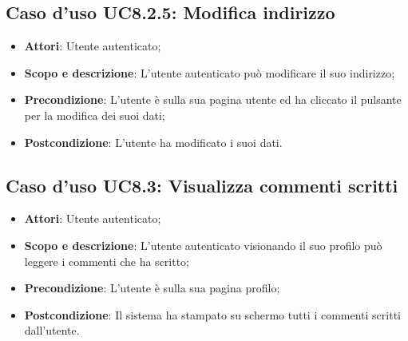 \documentclass[12pt,a4paper,titlepage]{article}
\begin{document}
	\subsection{Caso d'uso UC8.2.5: Modifica indirizzo}
	\label{UC8.2.5}
	\begin{itemize}
		\item \textbf{Attori}: Utente autenticato;
		\item \textbf{Scopo e descrizione}: L'utente autenticato può modificare il suo indirizzo;
		\item \textbf{Precondizione}: L'utente è sulla sua pagina utente ed ha cliccato il pulsante per la modifica dei suoi dati;
		\item \textbf{Postcondizione}: L'utente ha modificato i suoi dati.
	\end{itemize}

	\subsection{Caso d'uso UC8.3: Visualizza commenti scritti}
	\label{UC8.3}
	\begin{itemize}
		\item \textbf{Attori}: Utente autenticato;
		\item \textbf{Scopo e descrizione}: L'utente autenticato visionando il suo profilo può leggere i commenti che ha scritto;
		\item \textbf{Precondizione}: L'utente è sulla sua pagina profilo;
		\item \textbf{Postcondizione}: Il sistema ha stampato su schermo tutti i commenti scritti dall'utente.
	\end{itemize}
\end{document}
